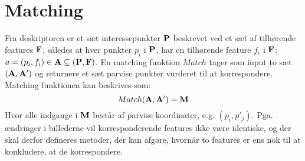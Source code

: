 \section{Matching}
Fra deskriptoren er et sæt interessepunkter $\bold{P}$ beskrevet ved et sæt af tilhørende features $\bold{F}$, således at hver punkter $p_i$ i $\bold{P}$, har en tilhørende feature $f_i$ i $\bold{F}$; $a = (p_i, f_i) \in \bold{A} \subseteq (\bold{P}, \bold{F})$. En matching funktion $Match$ tager som input to sæt $(\bold{A},\bold{A'})$ og returnere et sæt parvise punkter vurderet til at korrespondere. Matching funktionen kan beskrives som:
\begin{equation}
Match(\bold{A}, \bold{A}') = \bold{M}
\end{equation}
Hvor alle indgange i $\bold{M}$ består af parvise koordinater, e.g. $(p_i, p'_j)$. Pga. ændringer i billederne vil korresponderende features ikke være identiske, og der skal derfor defineres metoder, der kan afgøre, hvornår to features er ens nok til at konkludere, at de korrespondere.
